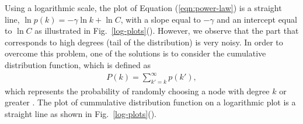 \documentclass[10pt,a4paper]{article}
\begin{document}
Using a logarithmic scale, the plot of Equation (\ref{eqn:power-law}) is a straight line, $\ln p(k) = -\gamma \ln k + \ln C $, with a slope equal to $-\gamma $ and an intercept equal to $\ln C$ as illustrated in Fig.~\ref{log-plots}(). However, we observe that the part that corresponds to high degrees (tail of the distribution) is very noisy. In order to overcome this problem, one of the solutions is to consider the cumulative distribution function, which is defined as 
\begin{eqnarray*}
	P(k) = \sum_{k'=k}^\infty p(k'),
\end{eqnarray*}
which represents the probability of randomly choosing a node with degree $k$ or greater \citep{estrada2011structure}. The plot of cummulative distribution function on a logarithmic plot is a straight line as shown in Fig.~\ref{log-plots}().
\end{document}
